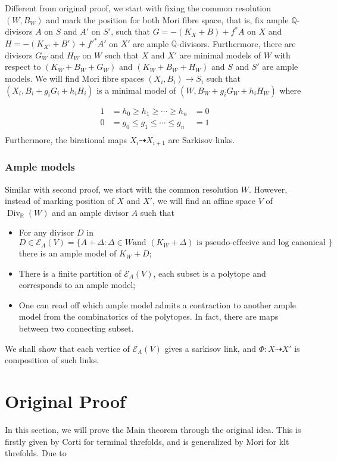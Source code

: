 \documentclass{article}
\begin{document}
Different from original proof, we start with fixing the common resolution $(W,B_W)$ and mark the position for both Mori fibre space, that is, fix ample $\mathbb{Q}$-divisors $A$ on $S$ and $A'$ on $S'$, such that $G=-(K_X+B)+f^*A$ on $X$ and $H=-(K_{X'}+B')+f'^*A'$ on $X'$ are ample $\mathbb{Q}$-divisors. Furthermore, there are divisors $G_W$ and $H_W$ on $W$ such that $X$ and $X'$ are minimal models of $W$ with respect to $(K_W+B_W+G_W)$ and $(K_W+B_W+H_W)$ and $S$ and $S'$ are ample models. We will find Mori fibre spaces $(X_i,B_i)\to S_i$ such that $(X_i,B_i+g_iG_i+h_iH_i)$ is a minimal model of $(W,B_W+g_iG_W+h_iH_W)$ where

\[
  \begin{aligned}
    1&=h_0\geqslant h_1 \geqslant \cdots \geqslant h_n&=0\\
    0&=g_0\leqslant g_1 \leqslant \cdots \leqslant g_n&=1\\
  \end{aligned}
\]
Furthermore, the birational maps $X_{i}\dashrightarrow X_{i+1}$ are Sarkisov links.
\subsubsection{Ample models}
Similar with second proof, we start with the common resolution $W$. However, instead of marking position of $X$ and $X'$, we will find an affine space $V$ of $\operatorname{Div}_\mathbb{R}(W)$ and an ample divisor $A$ such that 
\begin{itemize}
  \item For any divisor $D$ in
    \[
      D \in \mathcal{E}_A(V)= \{A+\Delta: \Delta \in W \text{and } (K_W+\Delta )\text{ is pseudo-effecive and log canonical }\}
    \]
  there is an ample model of $K_W+D$;
  \item There is a finite partition of $\mathcal{E}_A(V)$, each subset is a polytope and corresponds to an ample model;
  \item One can read off which ample model admits a contraction to another ample model from the combinatorics of the polytopes. In fact, there are maps between two connecting subset.
\end{itemize}
We shall show that each vertice of $\mathcal{E}_A( V )$ gives a sarkisov link, and $\Phi:X\dashrightarrow X'$ is composition of such links.
\section{Original Proof}
In this section, we will prove the Main theorem through the original idea. This is firstly given by Corti for terminal threfolds, and is generalized by Mori for klt threfolds. Due to 
\end{document}
